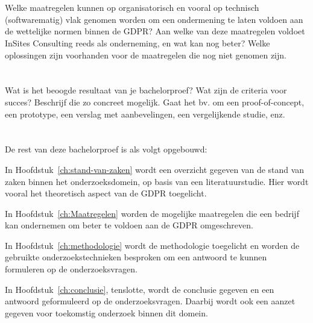 \section{}
\label{sec:onderzoeksvraag}

Welke maatregelen kunnen op organisatorisch en vooral op technisch (softwarematig) vlak genomen worden om een ondermening te laten voldoen aan de wettelijke normen binnen de GDPR? Aan welke van deze maatregelen voldoet InSites Consulting reeds als onderneming, en wat kan nog beter? Welke oplossingen zijn voorhanden voor de maatregelen die nog niet genomen zijn. 

\section{}
\label{sec:onderzoeksdoelstelling}

Wat is het beoogde resultaat van je bachelorproef? Wat zijn de criteria voor succes? Beschrijf die zo concreet mogelijk. Gaat het bv. om een proof-of-concept, een prototype, een verslag met aanbevelingen, een vergelijkende studie, enz.

\section{}
\label{sec:opzet-bachelorproef}


De rest van deze bachelorproef is als volgt opgebouwd:

In Hoofdstuk~\ref{ch:stand-van-zaken} wordt een overzicht gegeven van de stand van zaken binnen het onderzoeksdomein, op basis van een literatuurstudie. Hier wordt vooral het theoretisch aspect van de GDPR toegelicht. 

In Hoofdstuk~\ref{ch:Maatregelen} worden de mogelijke maatregelen die een bedrijf kan ondernemen om beter te voldoen aan de GDPR omgeschreven. 

In Hoofdstuk~\ref{ch:methodologie} wordt de methodologie toegelicht en worden de gebruikte onderzoekstechnieken besproken om een antwoord te kunnen formuleren op de onderzoeksvragen.


In Hoofdstuk~\ref{ch:conclusie}, tenslotte, wordt de conclusie gegeven en een antwoord geformuleerd op de onderzoeksvragen. Daarbij wordt ook een aanzet gegeven voor toekomstig onderzoek binnen dit domein.